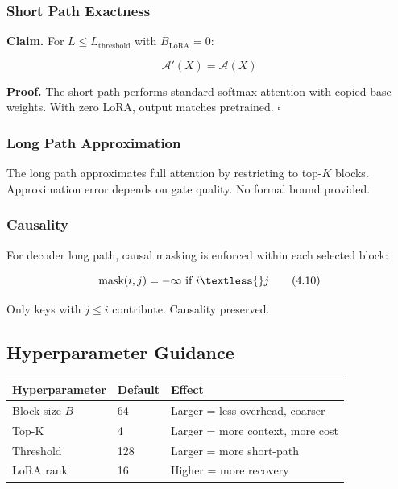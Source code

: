 \subsubsection{Short Path Exactness}

\textbf{Claim.} For $L \leq L_\text{threshold}$ with $B_\text{LoRA} = 0$:

\[
\mathcal{A}'(X) = \mathcal{A}(X)
\tag{4.9}
\]

\textbf{Proof.} The short path performs standard softmax attention with copied 
base weights. With zero LoRA, output matches pretrained. $\square$

\subsubsection{Long Path Approximation}

The long path approximates full attention by restricting to top-$K$ blocks. 
Approximation error depends on gate quality. No formal bound provided.

\subsubsection{Causality}

For decoder long path, causal masking is enforced within each selected block:

\[
\text{mask}(i, j) = -\infty \text{ if } i \textless{} j
\tag{4.10}
\]

Only keys with $j \leq i$ contribute. Causality preserved.

\subsection{Hyperparameter Guidance}

\begin{table}[H]
\centering
\small
\begin{tabular}{lll}
\toprule
\textbf{Hyperparameter} & \textbf{Default} & \textbf{Effect} \\
\midrule
Block size $B$ & 64 & Larger = less overhead, coarser \\
Top-K & 4 & Larger = more context, more cost \\
Threshold & 128 & Larger = more short-path \\
LoRA rank & 16 & Higher = more recovery \\
\bottomrule
\end{tabular}
\end{table}

